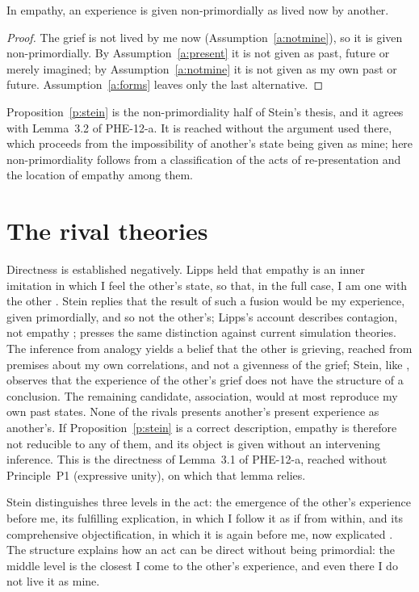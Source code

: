 \documentclass{situationist-preprint}
\begin{document}
\begin{proposition}\label{p:stein}
In empathy, an experience is given non-primordially as lived now by another.
\end{proposition}

\begin{proof}
The grief is not lived by me now (Assumption~\ref{a:notmine}), so it is given non-primordially. By Assumption~\ref{a:present} it is not given as past, future or merely imagined; by Assumption~\ref{a:notmine} it is not given as my own past or future. Assumption~\ref{a:forms} leaves only the last alternative.
\end{proof}

Proposition~\ref{p:stein} is the non-primordiality half of Stein's thesis, and it agrees with Lemma~3.2 of PHE-12-a. It is reached without the argument used there, which proceeds from the impossibility of another's state being given as mine; here non-primordiality follows from a classification of the acts of re-presentation and the location of empathy among them.

\section{The rival theories}

Directness is established negatively. Lipps held that empathy is an inner imitation in which I feel the other's state, so that, in the full case, I am one with the other \citep{Lipps1903}. Stein replies that the result of such a fusion would be my experience, given primordially, and so not the other's; Lipps's account describes contagion, not empathy \citep[ch.~2]{Stein1917}; \citet{Zahavi2014} presses the same distinction against current simulation theories. The inference from analogy yields a belief that the other is grieving, reached from premises about my own correlations, and not a givenness of the grief; Stein, like \citet{Scheler1923}, observes that the experience of the other's grief does not have the structure of a conclusion. The remaining candidate, association, would at most reproduce my own past states. None of the rivals presents another's present experience as another's. If Proposition~\ref{p:stein} is a correct description, empathy is therefore not reducible to any of them, and its object is given without an intervening inference. This is the directness of Lemma~3.1 of PHE-12-a, reached without Principle~P1 (expressive unity), on which that lemma relies.

Stein distinguishes three levels in the act: the emergence of the other's experience before me, its fulfilling explication, in which I follow it as if from within, and its comprehensive objectification, in which it is again before me, now explicated \citep[ch.~2]{Stein1917}. The structure explains how an act can be direct without being primordial: the middle level is the closest I come to the other's experience, and even there I do not live it as mine.
\end{document}
